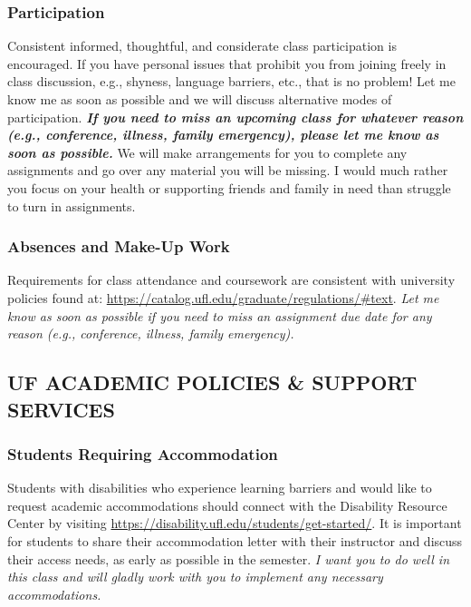 \documentclass[
  12pt,
]{article}
\begin{document}
\hypertarget{participation}{%
\subsubsection{\texorpdfstring{\textbf{Participation}}{Participation}}\label{participation}}

Consistent informed, thoughtful, and considerate class participation is
encouraged. If you have personal issues that prohibit you from joining
freely in class discussion, e.g., shyness, language barriers, etc., that
is no problem! Let me know me as soon as possible and we will discuss
alternative modes of participation. \textbf{\emph{If you need to miss an
upcoming class for whatever reason (e.g., conference, illness, family
emergency), please let me know as soon as possible.}} We will make
arrangements for you to complete any assignments and go over any
material you will be missing. I would much rather you focus on your
health or supporting friends and family in need than struggle to turn in
assignments.

\hypertarget{absences-and-make-up-work}{%
\subsubsection{\texorpdfstring{\textbf{Absences and Make-Up
Work}}{Absences and Make-Up Work}}\label{absences-and-make-up-work}}

Requirements for class attendance and coursework are consistent with
university policies found at:
\url{https://catalog.ufl.edu/graduate/regulations/\#text}. \emph{Let me
know as soon as possible if you need to miss an assignment due date for
any reason (e.g., conference, illness, family emergency).}

\hypertarget{uf-academic-policies-support-services}{%
\subsection{UF ACADEMIC POLICIES \& SUPPORT
SERVICES}\label{uf-academic-policies-support-services}}

\hypertarget{students-requiring-accommodation}{%
\subsubsection{\texorpdfstring{\textbf{Students Requiring
Accommodation}}{Students Requiring Accommodation}}\label{students-requiring-accommodation}}

Students with disabilities who experience learning barriers and would
like to request academic accommodations should connect with the
Disability Resource Center by visiting
\url{https://disability.ufl.edu/students/get-started/}. It is important
for students to share their accommodation letter with their instructor
and discuss their access needs, as early as possible in the semester.
\emph{I want you to do well in this class and will gladly work with you
to implement any necessary accommodations.}
\end{document}
